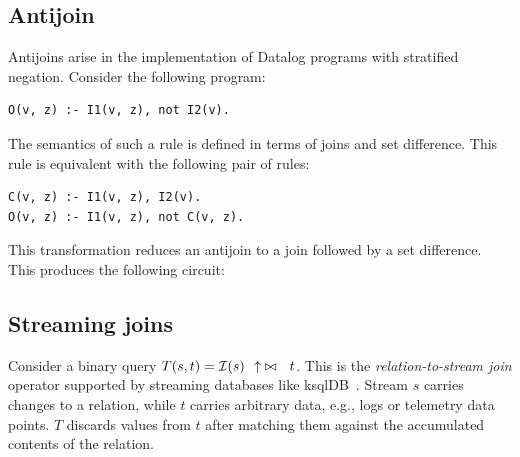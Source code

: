 \subsection{Antijoin}\label{sec:antijoin}

Antijoins arise in the implementation of Datalog programs with stratified negation.
Consider the following program:

\begin{lstlisting}[language=ddlog]
O(v, z) :- I1(v, z), not I2(v).     
\end{lstlisting}

The semantics of such a rule is defined in terms of joins and set difference.
This rule is equivalent with the following pair of rules:

\begin{lstlisting}[language=ddlog]
C(v, z) :- I1(v, z), I2(v).
O(v, z) :- I1(v, z), not C(v, z).     
\end{lstlisting}

This transformation reduces an antijoin to a join 
followed by a set difference.  This produces the following \dbsp circuit:


\subsection{Streaming joins}

Consider a binary query $T(s, t) = \mathcal{I}(s)~~{\uparrow}\bowtie~~t$.  This is the
\emph{relation-to-stream join} operator supported by streaming databases like ksqlDB~\cite{jafarpour-edbt19}.
Stream $s$ carries changes to a relation, while $t$ carries arbitrary data, e.g., logs
or telemetry data points. $T$ discards values from $t$ after matching them against the accumulated contents of the relation.

